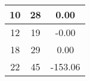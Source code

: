 \begin{table}[H]
\begin{minipage}{.5\linewidth}
\begin{tabular}{|c|c|c|}
            \hline
            10            & 28            & 0.00                          \\ 
            \hline
            12            & 19            & -0.00                         \\ 
            \hline
            18            & 29            & 0.00                          \\ 
            \hline
            22            & 45            & -153.06                       \\
            \hline    
        \end{tabular}
    \end{minipage} 
\end{table}